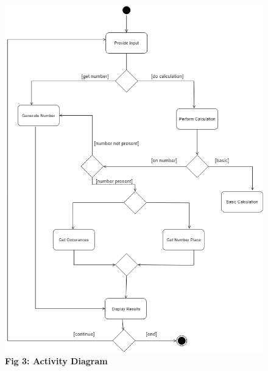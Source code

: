 \documentclass[paper=a4, fontsize=11pt]{report}
\numberwithin{equation}{section}		%
\numberwithin{figure}{section}			%
\numberwithin{table}{section}				%
\begin{document}
\pagebreak
\begin{figure}[htp]
    \centering
    \includegraphics[width=15cm]{ActivityDiagram.png}
    \caption*{\textbf{Fig 3: Activity Diagram}}
\end{figure}
\end{document}
